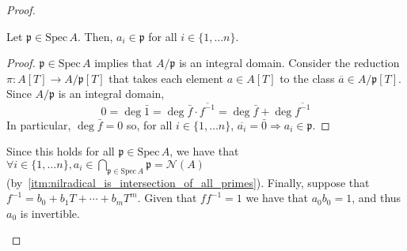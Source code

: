 \begin{problem}
\begin{enumerate}[label=(\theproblem.\arabic*),ref=\theproblem.\arabic*]
\begin{sol}
\begin{proof}
\begin{itemize}
\begin{claim}
                            Let $\mathfrak{p} \in \text{Spec}\,A$.
                            Then, $a_i \in \mathfrak{p}$ for all $i \in \{1, \ldots n\}$.
                            \begin{proof}
                                $\mathfrak{p} \in \text{Spec}\,A$ implies that $A/\mathfrak{p}$ is an integral domain.
                                Consider the reduction $\pi: A[T] \rightarrow A/\mathfrak{p}[T]$ that takes each element $a \in A[T]$ to the class $\overline{a} \in A/\mathfrak{p}[T]$.
                                Since $A/\mathfrak{p}$ is an integral domain,
                                \[
                                    0 = \deg \bar{1} = \deg \bar{f} \cdot \overline{f^{-1}} =
                                    \deg \bar{f} + \deg \overline{f^{-1}}
                                \]
                                In particular, $\deg \bar{f} = 0$ so, for all $i \in \{1, \ldots n\}$,
                                $\overline{a_i} = \bar{0} \Rightarrow a_i \in \mathfrak{p}$.
                            \end{proof}
                        \end{claim}
                        Since this holds for all $\mathfrak{p} \in \text{Spec}\,A$, we have that $ \forall i \in \{1, \ldots n\},
                        a_i \in \bigcap_{\mathfrak{p} \in \text{Spec}\,A}\mathfrak{p} = \mathcal{N}(A)$ (by~\ref{itm:nilradical_is_intersection_of_all_primes}).
                        Finally, suppose that $f^{-1} = b_0 + b_1 T + \cdots + b_m T^m$.
                        Given that $f f^{-1}=1$ we have that $a_0 b_0 = 1$, and thus $a_0$ is invertible.
                    \end{itemize}
                \end{proof}
            \end{sol}


\end{enumerate}
\end{problem}
